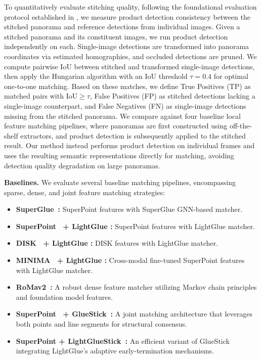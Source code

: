 \documentclass[10pt,twocolumn,letterpaper]{article}
\begin{document}
To quantitatively evaluate stitching quality, following the foundational evaluation protocol established in \cite{image_stitching_eval}, we measure product detection consistency between the stitched panorama and reference detections from individual images. Given a stitched panorama and its constituent images, we run product detection independently on each. Single-image detections are transformed into panorama coordinates via estimated homographies, and occluded detections are pruned. We compute pairwise IoU between stitched and transformed single-image detections, then apply the Hungarian algorithm with an IoU threshold $\tau = 0.4$ for optimal one-to-one matching. Based on these matches, we define True Positives (TP) as matched pairs with $\text{IoU} \geq \tau$, False Positives (FP) as stitched detections lacking a single-image counterpart, and False Negatives (FN) as single-image detections missing from the stitched panorama. We compare against four baseline local feature matching pipelines, where panoramas are first constructed using off-the-shelf extractors, and product detection is subsequently applied to the stitched result. Our method instead performs product detection on individual frames and uses the resulting semantic representations directly for matching, avoiding detection quality degradation on large panoramas.


\noindent\textbf{Baselines.}
We evaluate several baseline matching pipelines, encompassing sparse, dense, and joint feature matching strategies:
\begin{itemize}
    \item \textbf{SuperGlue~\cite{Sarlin_2020_CVPR}:} SuperPoint features with SuperGlue GNN-based matcher.
    \item \textbf{SuperPoint~\cite{DeTone_2018_CVPR_Workshops} + LightGlue \cite{lightglue}:} SuperPoint features with LightGlue matcher.
    \item \textbf{DISK~\cite{NEURIPS2020_a42a596f} + LightGlue \cite{lightglue}:} DISK features with LightGlue matcher.
    \item \textbf{MINIMA~\cite{Ren_2025_CVPR} + LightGlue \cite{lightglue}:} Cross-modal fine-tuned SuperPoint features with LightGlue matcher.
    \item \textbf{RoMav2~\cite{edstedt2025romav2harderbetter}:} A robust dense feature matcher utilizing Markov chain principles and foundation model features.
    \item \textbf{SuperPoint~\cite{DeTone_2018_CVPR_Workshops} + GlueStick~\cite{Pautrat_2023_ICCV}:} A joint matching architecture that leverages both points and line segments for structural consensus.
    \item \textbf{SuperPoint \cite{DeTone_2018_CVPR_Workshops} + LightGlueStick~\cite{Ubingazhibov_2025_ICCV}:} An efficient variant of GlueStick integrating LightGlue's adaptive early-termination mechanisms.
\end{itemize}
\end{document}
